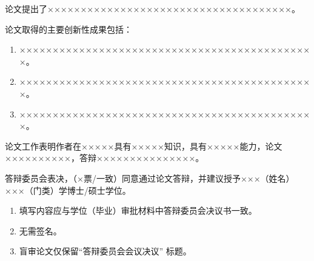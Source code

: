 

论文提出了×××××××××××××××××××××××××××××××××××××。

论文取得的主要创新性成果包括：
\begin{enumerate}
	\item ×××××××××××××××××××××××××××××××××××××××××××××。
	\item ×××××××××××××××××××××××××××××××××××××××××××××。
	\item ×××××××××××××××××××××××××××××××××××××××××××××。
\end{enumerate}

论文工作表明作者在×××××具有×××××知识，具有×××××能力，论文××××××××××，答辩×××××××××××××××。

答辩委员会表决，（×票/一致）同意通过论文答辩，并建议授予×××（姓名）×××（门类）学博士/硕士学位。


\vspace{\baselineskip}
{\color{red} 
	\begin{enumerate}
		\item 填写内容应与学位（毕业）审批材料中答辩委员会决议书一致。
		\item 无需签名。
		\item 盲审论文仅保留“答辩委员会会议决议” 标题。
	\end{enumerate}
	}

\clearpage{\pagestyle{empty}\cleardoublepage}%
